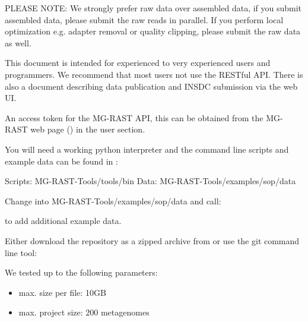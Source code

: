 \documentclass[letterpaper,10pt,english]{sphinxmanual}
\begin{document}
PLEASE NOTE: We strongly prefer raw data over assembled data, if you
submit assembled data, please submit the raw reads in parallel. If you
perform local optimization e.g. adapter removal or quality clipping,
please submit the raw data as well.

This document is intended for experienced to very experienced users and
programmers. We recommend that most users not use the RESTful API. There
is also a document describing data publication and INSDC submission via
the web UI.

An access token for the MG-RAST API, this can be obtained from the
MG-RAST web page () in the user section.

You will need a working python interpreter and the command line scripts
and example data can be found in
:

Scripts: MG-RAST-Tools/tools/bin Data: MG-RAST-Tools/examples/sop/data

Change into MG-RAST-Tools/examples/sop/data and call:

\begin{sphinxVerbatim}[commandchars=\\\{\}]
 
\end{sphinxVerbatim}

to add additional example data.

Either download the repository as a zipped archive from
 or use the
git command line tool:

\begin{sphinxVerbatim}[commandchars=\\\{\}]
  
\end{sphinxVerbatim}

We tested up to the following parameters:
\begin{itemize}
\item {} 
max. size per file: 10GB

\item {} 
max. project size: 200 metagenomes

\end{itemize}
\end{document}
